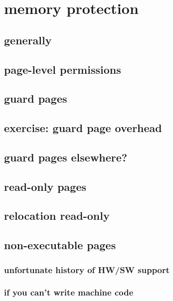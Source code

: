 
\section{memory protection}
\subsection{generally}


\subsection{page-level permissions}


\subsection{guard pages}


\subsection{exercise: guard page overhead}


\subsection{guard pages elsewhere?}


\subsection{read-only pages}


\subsection{relocation read-only}


\subsection{non-executable pages}


\subsubsection{unfortunate history of HW/SW support}


\subsubsection{if you can't write machine code}


